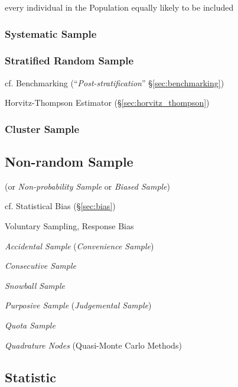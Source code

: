 every individual in the Population equally likely to be included



\subsubsection{Systematic Sample}\label{sec:systematic_sample}

\subsubsection{Stratified Random Sample}\label{sec:stratified_sample}

cf. Benchmarking (``\emph{Post-stratification}'' \S\ref{sec:benchmarking})

Horvitz-Thompson Estimator (\S\ref{sec:horvitz_thompson})



\subsubsection{Cluster Sample}\label{sec:cluster_sample}



\subsection{Non-random Sample}\label{sec:nonrandom_sample}

(or \emph{Non-probability Sample} or \emph{Biased Sample})

cf. Statistical Bias (\S\ref{sec:bias})

Voluntary Sampling, Response Bias

\emph{Accidental Sample} (\emph{Convenience Sample})

\emph{Consecutive Sample}

\emph{Snowball Sample}

\emph{Purposive Sample} (\emph{Judgemental Sample})

\emph{Quota Sample}

\emph{Quadrature Nodes} (Quasi-Monte Carlo Methods) %



\subsection{Statistic}\label{sec:statistic}

